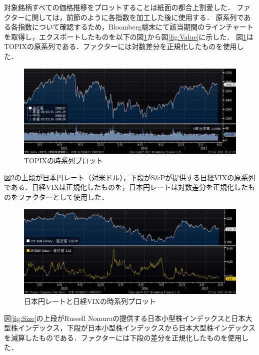 ﻿\documentclass[11pt]{jreport}
\begin{document}
対象銘柄すべての価格推移をプロットすることは紙面の都合上割愛した．
ファクターに関しては，前節のように各指数を加工した後に使用する．
原系列である各指数について確認するため，Bloomberg端末にて該当期間のラインチャートを取得し，エクスポートしたものを以下の図\ref{fig:TOPIX}から図\ref{fig:Value}に示した．
図\ref{fig:TOPIX}はTOPIXの原系列である．ファクターには対数差分を正規化したものを使用した．
\begin{figure}[H]
	\begin{center}
		\includegraphics[width=15cm]{./fig/TOPIX.jpg}
		\caption{TOPIXの時系列プロット}
		\label{fig:TOPIX}
	\end{center}
\end{figure}
図\ref{fig:VIX_JPY}の上段が日本円レート（対米ドル），下段がS\&Pが提供する日経VIXの原系列である．日経VIXは正規化したものを，日本円レートは対数差分を正規化したものをファクターとして使用した．
\begin{figure}[H]
	\begin{center}
		\includegraphics[width=15cm]{./fig/VIX_JPY.jpg}
		\caption{日本円レートと日経VIXの時系列プロット}
		\label{fig:VIX_JPY}
	\end{center}
\end{figure}
図\ref{fig:Size}の上段がRussell Nomuraの提供する日本小型株インデックスと日本大型株インデックス，下段が日本小型株インデックスから日本大型株インデックスを減算したものである．ファクターには下段の差分を正規化したものを使用した．
\end{document}
